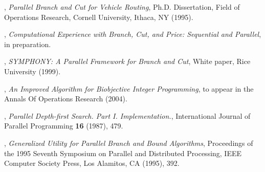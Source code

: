 \begin{thebibliography}{9}


, 
{\em Parallel Branch and Cut for Vehicle Routing},
Ph.D. Dissertation, Field of Operations Research,
Cornell University, Ithaca, NY (1995).

,
{\em Computational Experience with Branch, Cut, and Price: Sequential
and Parallel}, in preparation.

,
{\em SYMPHONY: A Parallel Framework for Branch and Cut},
White paper, Rice University (1999).

,
{\em An Improved Algorithm for Biobjective Integer Programming},
to appear in the Annals Of Operations Research (2004).


, {\em Parallel Depth-first
Search. Part I. Implementation.}, International Journal of Parallel
Programming {\bf 16} (1987), 479.





, {\em
Generalized Utility for Parallel Branch and Bound Algorithms},
Proceedings of the 1995 Seventh Symposium on Parallel and Distributed
Processing, IEEE Computer Society Press, Los Alamitos, CA (1995), 392.


\end{thebibliography}

